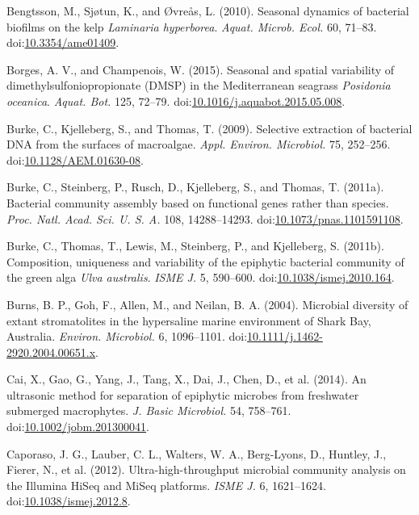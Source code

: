 \documentclass[12pt,]{article}
\begin{document}
\leavevmode\hypertarget{ref-Bengtsson2010}{}%
Bengtsson, M., Sjøtun, K., and Øvreås, L. (2010). Seasonal dynamics of
bacterial biofilms on the kelp \emph{Laminaria hyperborea}. \emph{Aquat.
Microb. Ecol.} 60, 71--83.
doi:\href{https://doi.org/10.3354/ame01409}{10.3354/ame01409}.

\leavevmode\hypertarget{ref-Borges2015}{}%
Borges, A. V., and Champenois, W. (2015). Seasonal and spatial
variability of dimethylsulfoniopropionate (DMSP) in the Mediterranean
seagrass \emph{Posidonia oceanica}. \emph{Aquat. Bot.} 125, 72--79.
doi:\href{https://doi.org/10.1016/j.aquabot.2015.05.008}{10.1016/j.aquabot.2015.05.008}.

\leavevmode\hypertarget{ref-Burke2009}{}%
Burke, C., Kjelleberg, S., and Thomas, T. (2009). Selective extraction
of bacterial DNA from the surfaces of macroalgae. \emph{Appl. Environ.
Microbiol.} 75, 252--256.
doi:\href{https://doi.org/10.1128/AEM.01630-08}{10.1128/AEM.01630-08}.

\leavevmode\hypertarget{ref-Burke2011}{}%
Burke, C., Steinberg, P., Rusch, D., Kjelleberg, S., and Thomas, T.
(2011a). Bacterial community assembly based on functional genes rather
than species. \emph{Proc. Natl. Acad. Sci. U. S. A.} 108, 14288--14293.
doi:\href{https://doi.org/10.1073/pnas.1101591108}{10.1073/pnas.1101591108}.

\leavevmode\hypertarget{ref-Burke2011a}{}%
Burke, C., Thomas, T., Lewis, M., Steinberg, P., and Kjelleberg, S.
(2011b). Composition, uniqueness and variability of the epiphytic
bacterial community of the green alga \emph{Ulva australis}. \emph{ISME
J.} 5, 590--600.
doi:\href{https://doi.org/10.1038/ismej.2010.164}{10.1038/ismej.2010.164}.

\leavevmode\hypertarget{ref-Burns2004}{}%
Burns, B. P., Goh, F., Allen, M., and Neilan, B. A. (2004). Microbial
diversity of extant stromatolites in the hypersaline marine environment
of Shark Bay, Australia. \emph{Environ. Microbiol.} 6, 1096--1101.
doi:\href{https://doi.org/10.1111/j.1462-2920.2004.00651.x}{10.1111/j.1462-2920.2004.00651.x}.

\leavevmode\hypertarget{ref-Cai2014}{}%
Cai, X., Gao, G., Yang, J., Tang, X., Dai, J., Chen, D., et al. (2014).
An ultrasonic method for separation of epiphytic microbes from
freshwater submerged macrophytes. \emph{J. Basic Microbiol.} 54,
758--761.
doi:\href{https://doi.org/10.1002/jobm.201300041}{10.1002/jobm.201300041}.

\leavevmode\hypertarget{ref-Caporaso2012}{}%
Caporaso, J. G., Lauber, C. L., Walters, W. A., Berg-Lyons, D., Huntley,
J., Fierer, N., et al. (2012). Ultra-high-throughput microbial community
analysis on the Illumina HiSeq and MiSeq platforms. \emph{ISME J.} 6,
1621--1624.
doi:\href{https://doi.org/10.1038/ismej.2012.8}{10.1038/ismej.2012.8}.
\end{document}
